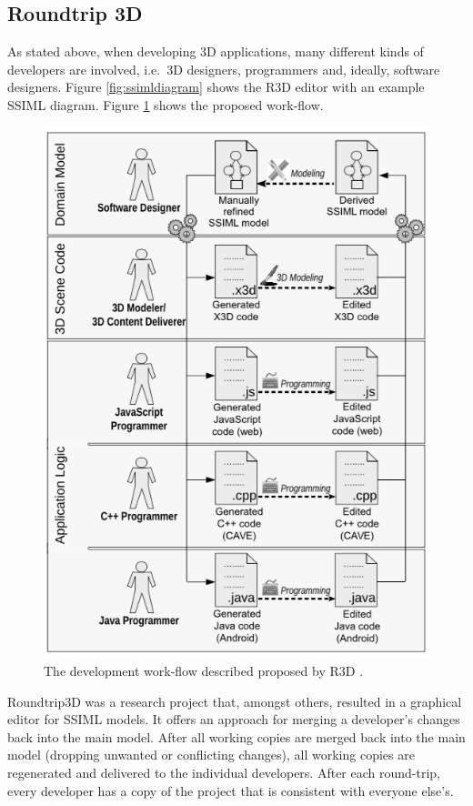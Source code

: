 \subsection{Roundtrip 3D}\label{roundtrip-3d}

As stated above, when developing \gls{3D} applications, many different kinds of
developers are involved, i.e.~\gls{3D} designers, programmers and, ideally,
software designers. Figure \ref{fig:ssimldiagram} shows the \gls{R3D} editor with an example \gls{SSIML} diagram.
Figure \ref{fig:csrd} shows the proposed work-flow.

\begin{figure}
  \includegraphics[width=\textwidth]{../assets/csrd2014.png}
  \caption{The development work-flow described proposed by \gls{R3D} \cite{Jung:2015:SDA:2802768.2802837}.}
  \label{fig:csrd}
\end{figure}

Roundtrip3D was a research project that, amongst others, resulted in a
graphical editor for \gls{SSIML} models. It offers an
approach for merging a developer's changes back into the main model.
After all working copies are merged back into the main model (dropping
unwanted or conflicting changes), all working copies are regenerated and
delivered to the individual developers. After each round-trip, every
developer has a copy of the project that is consistent with everyone
else's. \cite{Jung:2015:SDA:2802768.2802837}

